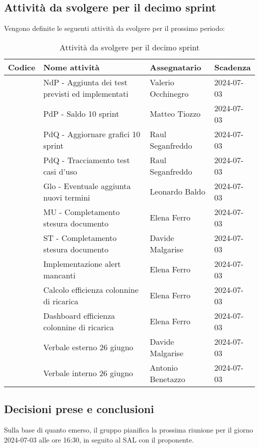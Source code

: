 \documentclass[italian,12pt]{article}
\begin{document}
\newpage

\subsection{Attività da svolgere per il decimo sprint}
Vengono definite le seguenti attività da svolgere per il prossimo periodo:
\begin{table}[!h]
	\centering
	\begin{tabular}{ |l||p{7cm}|l|l| }
		\hline
		\textbf{Codice}          & \textbf{Nome attività}                           & \textbf{Assegnatario} & \textbf{Scadenza} \\
		\hline
		\mySkip[86bz8e29k]       & NdP - Aggiunta dei test previsti ed implementati & Valerio Occhinegro    & 2024-07-03        \\
		\mySkip[86bz8e6dg]       & PdP - Saldo 10 sprint                            & Matteo Tiozzo         & 2024-07-03        \\
		\mySkip[86bz8e4c2]       & PdQ - Aggiornare grafici 10 sprint               & Raul Seganfreddo      & 2024-07-03        \\
		\mySkip[86bz8e54v]       & PdQ - Tracciamento test casi d'uso               & Raul Seganfreddo      & 2024-07-03        \\
		\mySkip[86bz8e8hb]       & Glo - Eventuale aggiunta nuovi termini           & Leonardo Baldo        & 2024-07-03        \\
		\mySkip[86bz8e2n7]       & MU - Completamento stesura documento             & Elena Ferro           & 2024-07-03        \\
		\mySkip[86bz8e3y2]       & ST - Completamento stesura documento             & Davide Malgarise      & 2024-07-03        \\
		\mySkip[86bz8e010]       & Implementazione alert mancanti                   & Elena Ferro           & 2024-07-03        \\
		\mySkip[86byzyxk3]       & Calcolo efficienza colonnine di ricarica         & Elena Ferro           & 2024-07-03        \\
		\mySkip[86byzyxhh]       & Dashboard efficienza colonnine di ricarica       & Elena Ferro           & 2024-07-03        \\
		\mySkip[86bz9gkmf]       & Verbale esterno 26 giugno                        & Davide Malgarise      & 2024-07-03        \\
		\mySkip[86bz9gkth]       & Verbale interno 26 giugno                        & Antonio Benetazzo     & 2024-07-03        \\
		\hline
	\end{tabular}
	\caption{Attività da svolgere per il decimo sprint}
\end{table}

\subsection{Decisioni prese e conclusioni}
Sulla base di quanto emerso, il gruppo pianifica la prossima riunione per il giorno 2024-07-03 alle ore 16:30,
in seguito al SAL con il proponente.
\end{document}
